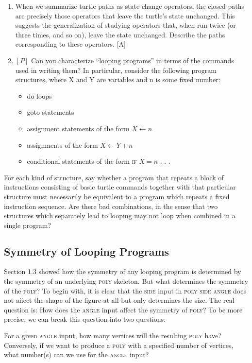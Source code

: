 \documentclass{book}
\begin{document}
\begin{enumerate}
\item When we summarize turtle paths as state-change operators, the
closed paths are precisely those operators that leave the turtle's state
unchanged. This suggests the generalization of studying operators that,
when run twice (or three times, and so on), leave the state unchanged.
Describe the paths corresponding to these operators. [A]

\item $[P]$ Can you characterize ``looping programs'' in terms of the commands used in writing them? In particular, consider the following program structures, where X and Y are variables and n is some fixed number:
\begin{itemize}
\item do loops
\item goto statements
\item assignment statements of the form $X \leftarrow n$
\item assignments of the form $X \leftarrow Y + n$
\item conditional statements of the form \textsc{if} $X = n$ . . .
\end{itemize}
\end{enumerate}
\indent
For each kind of structure, say whether a program that repeats a block
of instructions consisting of basic turtle commands together with that
particular structure must necessarily be equivalent to a program which
repeats a fixed instruction sequence. Are there bad combinations, in the
sense that two structures which separately lead to looping may not loop
when combined in a single program?

\subsection{Symmetry of Looping Programs}

Section 1.3 showed how the symmetry of any looping program is determined by the symmetry of an underlying \textsc{poly} skeleton. But what determines the symmetry of the \textsc{poly}? To begin with, it is clear that the \textsc{side} input in \textsc{poly side angle} does not aiiect the shape of the figure at all but only determines the size. The real question is: How does the \textsc{angle} input affect the symmetry of \textsc{poly}? To be more precise, we can break this question into two questions:

For a given \textsc{angle} input, how many vertices will the resulting \textsc{poly} have?
Conversely, if we want to produce a \textsc{poly} with a specified number of
vertices, what number(s) can we use for the \textsc{angle} input?
\end{document}
